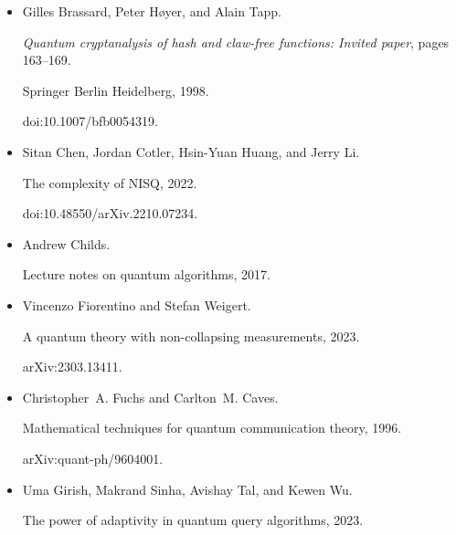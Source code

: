 \begin{itemize}
\emph{SIAM Journal on Computing}, 26(5):1510–1523, October 1997.


doi:10.1137/s0097539796300933.





\item[] 
[13]

Gilles Brassard, Peter Høyer, and Alain Tapp.


\emph{Quantum cryptanalysis of hash and claw-free functions: Invited
paper}, pages 163–169.


Springer Berlin Heidelberg, 1998.


doi:10.1007/bfb0054319.





\item[] 
[14]

Sitan Chen, Jordan Cotler, Hsin-Yuan Huang, and Jerry Li.


The complexity of NISQ, 2022.


doi:10.48550/arXiv.2210.07234.





\item[] 
[15]

Andrew Childs.


Lecture notes on quantum algorithms, 2017.





\item[] 
[16]

Vincenzo Fiorentino and Stefan Weigert.


A quantum theory with non-collapsing measurements, 2023.


arXiv:2303.13411.





\item[] 
[17]

Christopher A. Fuchs and Carlton M. Caves.


Mathematical techniques for quantum communication theory, 1996.


arXiv:quant-ph/9604001.





\item[] 
[18]

Uma Girish, Makrand Sinha, Avishay Tal, and Kewen Wu.


The power of adaptivity in quantum query algorithms, 2023.



\end{itemize}
